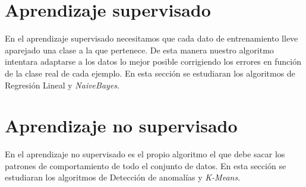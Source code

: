\section{Aprendizaje supervisado}
En el aprendizaje supervisado necesitamos que cada dato de entrenamiento lleve aparejado una clase 
a la que pertenece. De esta manera nuestro algoritmo intentara adaptarse a los datos lo mejor 
posible corrigiendo los errores en función de la clase real de cada ejemplo.
En esta sección se estudiaran los algoritmos de Regresión Lineal y \textit{NaiveBayes}.



\section{Aprendizaje no supervisado}
En el aprendizaje no supervisado es el propio algoritmo el que debe sacar los patrones de 
comportamiento de todo el conjunto de datos.
En esta sección se estudiaran los algoritmos de Detección de anomalías y \textit{K-Means}.

